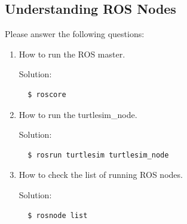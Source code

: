 \documentclass[12pt]{article}
\begin{document}
\subsection{Understanding ROS Nodes}
Please answer the following questions:
\begin{enumerate}
\item How to run the ROS master. 

Solution:

\begin{verbatim}
  $ roscore
\end{verbatim}

\item How to run the turtlesim\_node.

Solution:

\begin{verbatim}
  $ rosrun turtlesim turtlesim_node
\end{verbatim}

\item How to check the list of running ROS nodes.

Solution:

\begin{verbatim}
  $ rosnode list
\end{verbatim}

\end{enumerate}
\end{document}
